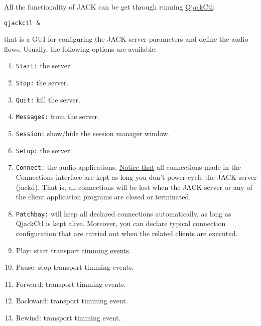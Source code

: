 All the functionality of JACK can be get through running
\href{https://qjackctl.sourceforge.io/}{QjackCtl}:
\begin{verbatim}
qjackctl &
\end{verbatim}
that is a GUI for configuring the JACK server parameters and define the audio flows. Usually, the following options are available:
\begin{enumerate}
\item \texttt{Start:} the server.
\item \texttt{Stop:} the server.
\item \texttt{Quit:} kill the server.
\item \texttt{Messages:} from the server.
\item \texttt{Session:} show/hide the session manager window.
\item \texttt{Setup:} the server. 
\item \texttt{Connect:} the audio
  applications. \href{http://www.rncbc.org/drupal/node/76}{Notice
    that} all connections made in the Connections interface are kept
  as long you don't power-cycle the JACK server (jackd). That is, all
  connections will be lost when the JACK server or any of the client
  application programs are closed or terminated.
\item \texttt{Patchbay:} will keep all declared connections
  automatically, as long as QjackCtl is kept alive. Moreover, you can
  declare typical connection configuration that are carried out when
  the related clients are executed.
\item Play: start transport
  \href{https://jackaudio.org/api/group__MIDIAPI.html}{timming
    events}.
\item Pause: stop transport timming events.
\item Forward: transport timming events.
\item Backward: transport timming event.
\item Rewind: transport timming event.
\end{enumerate}


